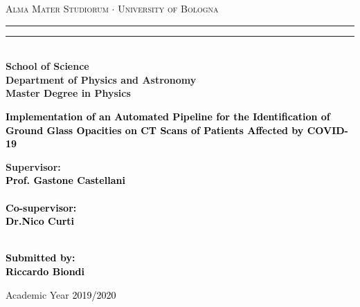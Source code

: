 \begin{titlepage}
%
%
%
%
\begin{center}
{{\Large{\textsc{Alma Mater Studiorum $\cdot$ University of  Bologna}}}} 
\rule[0.1cm]{15.8cm}{0.1mm}
\rule[0.5cm]{15.8cm}{0.6mm}
\\\vspace{3mm}
{\small{\bf School of Science \\
Department of Physics and Astronomy\\
Master Degree in Physics}}
\end{center}

\vspace{25mm}

\begin{center}\textcolor{black}{
%
%
{\Large{\bf Implementation of an Automated Pipeline for the Identification of Ground Glass Opacities on CT Scans of Patients Affected by COVID-19}}
}\end{center}

\vspace{50mm} \par \noindent

\begin{minipage}[t]{0.49\textwidth}
%
%
{\large{\bf Supervisor: \vspace{2mm}\\\textcolor{black}{
Prof. Gastone Castellani}\\\\
%
%
%
\textcolor{black}{
\bf Co-supervisor:\\
\vspace{2mm}
Dr.Nico Curti}}}\\\\
\end{minipage}

%
\hfill
%
\begin{minipage}[t]{0.47\textwidth}\raggedleft \textcolor{black}{
{\large{\bf Submitted by:
\vspace{2mm}\\
%
%
\textcolor{black}{
Riccardo Biondi}}}
}
\end{minipage}

\vspace{40mm}

\begin{center}
%
%
Academic Year \textcolor{black}{ 2019/2020}
\end{center}

\end{titlepage}

